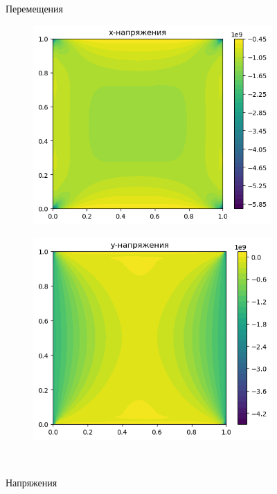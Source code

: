 \documentclass[12pt, a4paper]{article}
\begin{document}
\begin{figure}[H]
\begin{subfigure}[H]{0.4\textwidth}
		\end{subfigure}	
		\\[0.2cm]
		\caption{Перемещения}
	\end{figure}	
	\begin{figure}[H]
	\centering
	\begin{subfigure}[H]{0.4\textwidth}
		\includegraphics[width=\textwidth]{stress_x}
	\end{subfigure}
	\qquad\qquad
	\begin{subfigure}[H]{0.4\textwidth}
		\includegraphics[width=\textwidth]{xtress_y}
	\end{subfigure}	
	\\[0.2cm]
	\caption{Напряжения}
\end{figure}	
\end{document}
